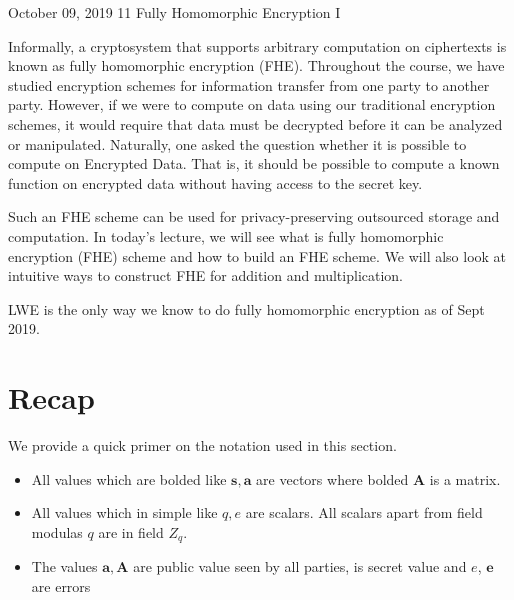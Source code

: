 \documentclass[usletter]{article}
\begin{document}
    
           {October 09, 2019}                          %
           {11}                                       %
           {Fully Homomorphic Encryption I}  %

\newcommand{\floor}[1]{\left\lfloor #1 \right\rfloor}
\newcommand{\ceil}[1]{\left\lceil #1 \right\rceil}

Informally, a cryptosystem that supports arbitrary computation on ciphertexts is known as fully homomorphic encryption (FHE)\cite{wiki}. Throughout the course, we have studied encryption schemes for information transfer from one party to another party. However, if we were to compute on data using our traditional encryption schemes, it would require that data must be decrypted before it can be analyzed or manipulated. Naturally, one asked the question whether it is possible to compute on Encrypted Data. That is, it should be possible to compute a known function on encrypted data without having access to the secret key. 

Such an FHE scheme can be used for privacy-preserving outsourced storage and computation. In today's lecture, we will see what is fully homomorphic encryption (FHE) scheme and how to build an FHE scheme. We will also look at intuitive ways to construct FHE for addition and multiplication.

\begin{fact}
LWE is the only way we know to do fully homomorphic encryption as of Sept 2019. 
\end{fact}
           
\section{Recap}

We provide a quick primer on the notation used in this section. 
\begin{itemize}
    \item All values which are bolded like $\pmb{s}, \pmb{a}$ are vectors where bolded $\pmb{A}$ is a matrix.
    \item All values which in simple like $q, e$ are scalars. All scalars apart from field modulas $q$ are in field $Z_q$.
    \item The values $\pmb{a}, \pmb{A}$ are public value seen by all parties,  is secret value and $e$, $\pmb{e}$ are errors
\end{itemize}
\end{document}
